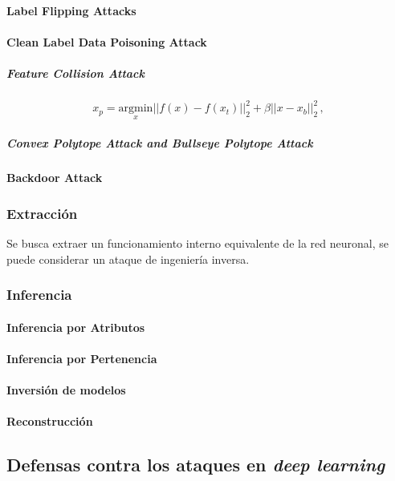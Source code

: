 \paragraph{Label Flipping Attacks}

\paragraph{Clean Label Data Poisoning Attack}


\subparagraph{Feature Collision Attack}
$$x_{p}={\underset{x}{\mathrm{argmin}}}||f\left(x\right)-f\left(x_{t}\right)||_{2}^{2}+\beta||x-x_{b}||_{2}^{2}\,,$$
% 


\subparagraph{Convex Polytope Attack and Bullseye Polytope Attack}

\paragraph{Backdoor Attack}


\subsubsection{Extracción}

Se busca extraer un funcionamiento interno equivalente de la red neuronal, se puede considerar un ataque de ingeniería inversa.

% 
\subsubsection{Inferencia}

\paragraph{Inferencia por Atributos}
\paragraph{Inferencia por Pertenencia}
\paragraph{Inversión de modelos}
\paragraph{Reconstrucción}

\subsection{Defensas contra los ataques en \textit{deep learning}}

